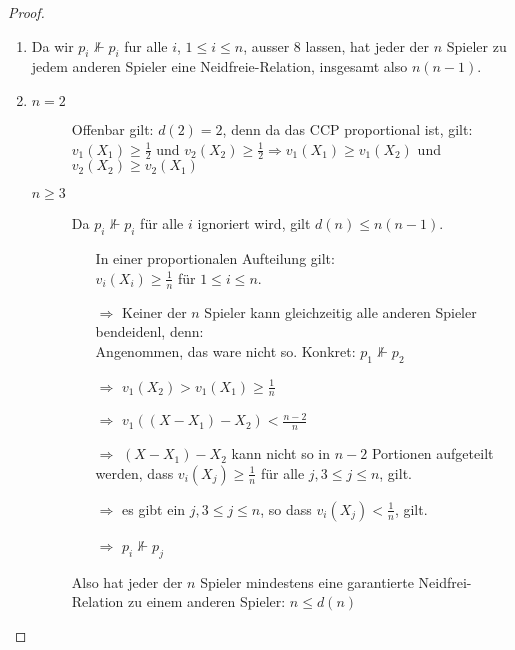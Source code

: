 \begin{proof}
 \begin{enumerate}
  \item Da wir $p_i\nVdash p_i$ fur alle $i$, $1\leq i\leq n$, ausser 8 lassen, hat jeder der $n$ Spieler zu jedem anderen Spieler eine
        Neidfreie-Relation, insgesamt also $n(n-1)$.
  \item \begin{description}
         \item[$n=2$] Offenbar gilt: $d(2)=2$, denn da das CCP proportional ist, gilt: $v_1(X_1)\geq\frac{1}{2}$ und $v_2(X_2)\geq\frac{1}{2}
                    \Rightarrow v_1(X_1)\geq v_1(X_2)$ und $v_2(X_2)\geq v_2(X_1)$
         \item[$n\geq3$] Da $p_i\nVdash p_i$ für alle $i$ ignoriert wird, gilt $d(n)\leq n(n-1)$.
                         \begin{itemize}
                          \item[] In einer proportionalen Aufteilung gilt:\\$v_i(X_i)\geq\frac{1}{n}$ für $1\leq i\leq n$.\\
                          \item[$\Rightarrow$] Keiner der $n$ Spieler kann gleichzeitig alle anderen Spieler bendeidenl, denn:\\
                                               Angenommen, das ware nicht so. Konkret: $p_1\nVdash p_2$
                          \item[$\Rightarrow$]$v_1(X_2)>v_1(X_1)\geq\frac{1}{n}$
                          \item[$\Rightarrow$]$v_1((X-X_1)-X_2)<\frac{n-2}{n}$
                          \item[$\Rightarrow$]$(X-X_1)-X_2$ kann nicht so in $n-2$ Portionen aufgeteilt werden, dass $v_i(X_j)\geq\frac{1}{n}$
                                              für alle $j,3\leq j\leq n$, gilt.
                          \item[$\Rightarrow$]es gibt ein $j,3\leq j\leq n$, so dass $v_i(X_j)<\frac{1}{n}$, gilt.
                          \item[$\Rightarrow$]$p_i\nVdash p_j$
                         \end{itemize}
                         Also hat jeder der $n$ Spieler mindestens eine garantierte Neidfrei-Relation zu einem anderen Spieler: $n\leq d(n)$  
        \end{description}
 \end{enumerate}
\end{proof}

